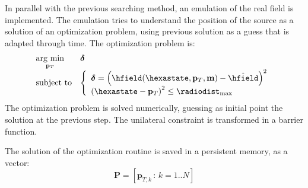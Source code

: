In parallel with the previous searching method, an emulation of the real field is implemented. The emulation tries to understand the position of the source as a solution of an optimization problem, using previous solution as a guess that is adapted through time. The optimization problem is:
\begin{equation}
\begin{array}{ll}
\underset{\mathbf{p}_T}{\mathrm{arg~min}} & \boldsymbol{\delta} \\
\mathrm{subject~to} & 	\left\{ \begin{array}{l}
							\boldsymbol{\delta} = \braces{\hfield(\hexastate,\mathbf{p}_T, \mathbf{m}) - \hat{\hfield}}^2 \\
							\braces{\hexastate - \mathbf{p}_T}^2  \leq  {\radiodist_{\mathrm{max}}}
						\end{array} \right. \\ 
\end{array}
\end{equation}
The optimization problem is solved numerically, guessing as initial point the solution at the previous step. The unilateral constraint is transformed in a barrier function.

The solution of the optimization routine is saved in a persistent memory, as a vector:
\[ \mathbf{P} = [ \mathbf{p}_{T,k} \,:\, k=1..N ] \]

